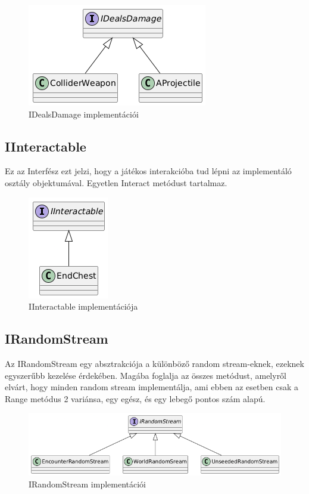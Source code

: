 \documentclass[
]{thesis-ekf}
\theoremstyle{definition}
\theoremstyle{remark}
\begin{document}
	\begin{figure}
		\centering
		\includegraphics[width=0.5\linewidth]{ImplementsIDealsDamage}
		\caption[IDealsDamage implementációi]{IDealsDamage implementációi}
		\label{fig:implementsidealsdamage}
	\end{figure}
	
	\subsection{IInteractable}
	Ez az Interfész ezt jelzi, hogy a játékos interakcióba tud lépni az implementáló osztály objektumával. Egyetlen Interact metódust tartalmaz.
	
	\begin{figure}
		\centering
		\includegraphics[width=0.25\linewidth]{implementsIInteractable}
		\caption[IInteractable implementációja]{IInteractable implementációja}
		\label{fig:implementsiinteractable}
	\end{figure}
	
	\subsection{IRandomStream}
	Az IRandomStream egy absztrakciója a különböző random stream-eknek, ezeknek egyszerűbb kezelése érdekében. Magába foglalja az összes metódust, amelyről elvárt, hogy minden random stream implementálja, ami ebben az esetben csak a Range metódus 2 variánsa, egy egész, és egy lebegő pontos szám alapú.
	
	\begin{figure}
		\centering
		\includegraphics[width=1\linewidth]{implementsIRandomStream}
		\caption[IRandomStream implementációi]{IRandomStream implementációi}
		\label{fig:implementsirandomstream}
	\end{figure}
	
\end{document}
